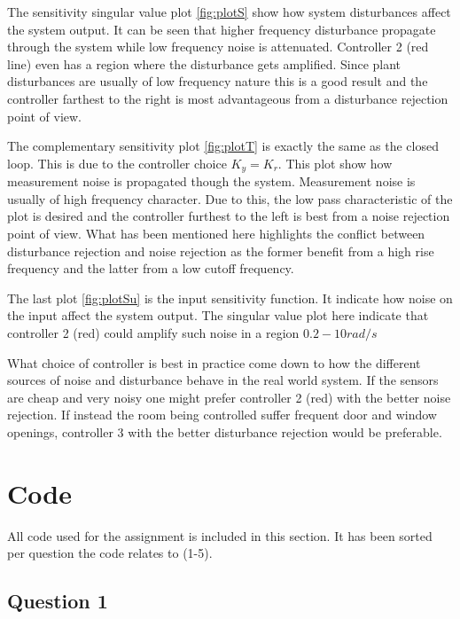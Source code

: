 \documentclass[a4paper, titlepage]{article}
\begin{document}
The sensitivity singular value plot \ref{fig:plotS} show how system disturbances affect the system output.
It can be seen that higher frequency disturbance propagate through the system while low frequency noise is attenuated.
Controller 2 (red line) even has a region where the disturbance gets amplified.
Since plant disturbances are usually of low frequency nature this is a good result and the controller farthest to the right is most advantageous from a disturbance rejection point of view.

The complementary sensitivity plot \ref{fig:plotT} is exactly the same as the closed loop.
This is due to the controller choice $K_y = K_r$.
This plot show how measurement noise is propagated though the system.
Measurement noise is usually of high frequency character.
Due to this, the low pass characteristic of the plot is desired and the controller furthest to the left is best from a noise rejection point of view.
What has been mentioned here highlights the conflict between disturbance rejection and noise rejection as the former benefit from a high rise frequency and the latter from a low cutoff frequency.

The last plot \ref{fig:plotSu} is the input sensitivity function.
It indicate how noise on the input affect the system output.
The singular value plot here indicate that controller 2 (red) could amplify such noise in a region $0.2 - 10 rad/s$

What choice of controller is best in practice come down to how the different sources of noise and disturbance behave in the real world system.
If the sensors are cheap and very noisy one might prefer  controller 2 (red) with the better noise rejection.
If instead the room being controlled suffer frequent door and window openings, controller 3 with the better disturbance rejection would be preferable.

\clearpage


\clearpage

\appendix

\section{Code}
All code used for the assignment is included in this section.
It has been sorted per question the code relates to (1-5).

\subsection{Question 1}

\clearpage
\end{document}
